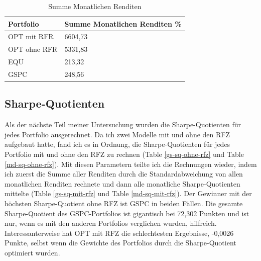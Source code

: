 \documentclass[12pt]{article}
\begin{document}
            \begin{table}[htp]
                \begin{center}
                    
                    \begin{tabular}{ | l | l | }

                        \hline
                        \textbf{Portfolio}   & \textbf{Summe Monatlichen Renditen \%} \\
                        \hline
                        OPT mit RFR          &      6604,73 \\            
                        OPT ohne RFR         &      5331,83 \\
                        EQU                  &      213,32 \\                 
                        GSPC                 &      248,56 \\          
                             
                        \hline

                    \end{tabular}
                    \caption{Summe Monatlichen Renditen}
                    \label{s-m-renditen-tab}
                \end{center}
            \end{table}

        \subsection{Sharpe-Quotienten}

        Als der nächste Teil meiner Untersuchung wurden die Sharpe-Quotienten für jedes Portfolio ausgerechnet. 
        Da ich zwei Modelle mit und ohne den RFZ aufgebaut hatte, 
        fand ich es in Ordnung, die Sharpe-Quotienten für jedes Portfolio 
        mit und ohne den RFZ zu rechnen (Table \ref{gs-sq-ohne-rfz} und Table \ref{md-sq-ohne-rfz}). 
        Mit diesen Parametern teilte ich die Rechnungen wieder, 
        indem ich zuerst die Summe aller Renditen durch die Standardabweichung von allen monatlichen Renditen rechnete und 
        dann alle monatliche Sharpe-Quotienten mittelte (Table \ref{gs-sq-mit-rfz} und Table \ref{md-sq-mit-rfz}). 
        Der Gewinner mit der höchsten Sharpe-Quotient ohne RFZ ist GSPC in beiden Fällen. 
        Die gesamte Sharpe-Quotient des GSPC-Portfolios ist gigantisch bei 72,302 Punkten und ist nur, 
        wenn es mit den anderen Portfolios verglichen wurden, hilfreich. 
        Interessanterweise hat OPT mit RFZ die schlechtesten Ergebnisse, -0,0026 Punkte, 
        selbst wenn die Gewichte des Portfolios durch die Sharpe-Quotient optimiert wurden.
\end{document}
